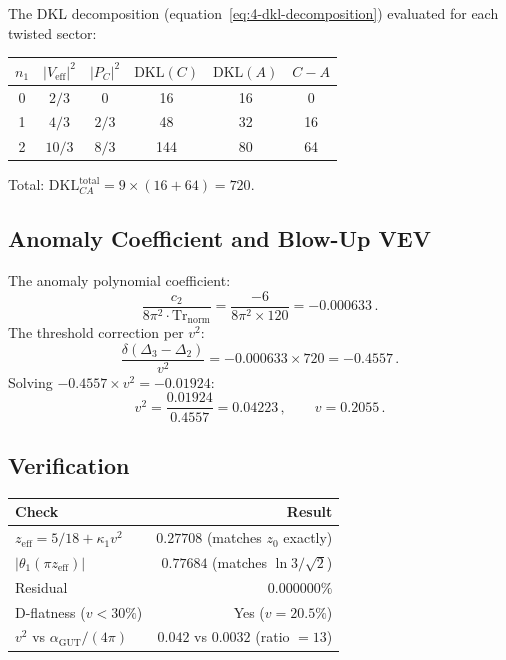 The DKL decomposition (equation~\eqref{eq:4-dkl-decomposition}) evaluated for each twisted sector:

\begin{center}
\begin{tabular}{c c c c c c}
\hline
$n_1$ & $|V_{\mathrm{eff}}|^2$ & $|P_C|^2$ & $\mathrm{DKL}(C)$ & $\mathrm{DKL}(A)$ & $C - A$ \\
\hline
0 & $2/3$ & $0$ & 16 & 16 & 0 \\
1 & $4/3$ & $2/3$ & 48 & 32 & 16 \\
2 & $10/3$ & $8/3$ & 144 & 80 & 64 \\
\hline
\end{tabular}
\end{center}

Total: $\mathrm{DKL}_{C\!A}^{\mathrm{total}} = 9 \times (16 + 64) = 720$.

\subsection{Anomaly Coefficient and Blow-Up VEV}
\label{app:gap-vev}

The anomaly polynomial coefficient:
\begin{equation}
  \frac{c_2}{8\pi^2 \cdot \mathrm{Tr}_{\mathrm{norm}}}
  = \frac{-6}{8\pi^2 \times 120}
  = -0.000633\,.
\end{equation}
The threshold correction per $v^2$:
\begin{equation}
  \frac{\delta(\Delta_3 - \Delta_2)}{v^2}
  = -0.000633 \times 720
  = -0.4557\,.
\end{equation}
Solving $-0.4557 \times v^2 = -0.01924$:
\begin{equation}
  v^2 = \frac{0.01924}{0.4557} = 0.04223\,,
  \qquad
  v = 0.2055\,.
\end{equation}

\subsection{Verification}
\label{app:gap-verify}

\begin{center}
\begin{tabular}{l r}
\hline
Check & Result \\
\hline
$z_{\mathrm{eff}} = 5/18 + \kappa_1 v^2$ & $0.27708$ (matches $z_0$ exactly) \\
$|\theta_1(\pi z_{\mathrm{eff}})|$ & $0.77684$ (matches $\ln 3/\sqrt{2}$) \\
Residual & $0.000000\%$ \\
D-flatness ($v < 30\%$) & Yes ($v = 20.5\%$) \\
$v^2$ vs $\alpha_{\mathrm{GUT}}/(4\pi)$ & $0.042$ vs $0.0032$ (ratio $= 13$) \\
\hline
\end{tabular}
\end{center}

